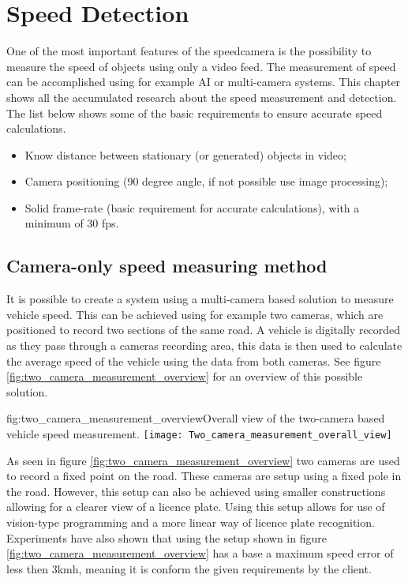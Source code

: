 \chapter{Speed Detection}
\label{chap:speed-detection}

One of the most important features of the speedcamera is the possibility to measure the speed of objects using only a video feed. The measurement of 
speed can be accomplished using for example AI or multi-camera systems. This chapter shows all the accumulated research about the speed measurement 
and detection. The list below shows some of the basic requirements to ensure accurate speed calculations.

\begin{itemize}
    \item Know distance between stationary (or generated) objects in video;
    \item Camera positioning (90 degree angle, if not possible use image processing);
    \item Solid frame-rate (basic requirement for accurate calculations), with a minimum of 30 fps.
\end{itemize}

\section{Camera-only speed measuring method}
It is possible to create a system using a multi-camera based solution to measure vehicle speed. This can be achieved using for example two cameras,
which are positioned to record two sections of the same road. A vehicle is digitally recorded as they pass through a cameras recording area, this data
is then used to calculate the average speed of the vehicle using the data from both cameras. See figure \ref{fig:two_camera_measurement_overview} for 
an overview of this possible solution.

\begin{linfigure}{fig:two_camera_measurement_overview}{Overall view of the two-camera based vehicle speed measurement.}
    \texttt{[image: Two\_camera\_measurement\_overall\_view]}
\end{linfigure}

As seen in figure \ref{fig:two_camera_measurement_overview} two cameras are used to record a fixed point on the road. These cameras are setup using a
fixed pole in the road. However, this setup can also be achieved using smaller constructions allowing for a clearer view of a licence plate. Using 
this setup allows for use of vision-type programming and a more linear way of licence plate recognition. Experiments have also shown that using the 
setup shown in figure \ref{fig:two_camera_measurement_overview} has a base a maximum speed error of less then 3kmh, meaning it is conform the given
requirements by the client. 

